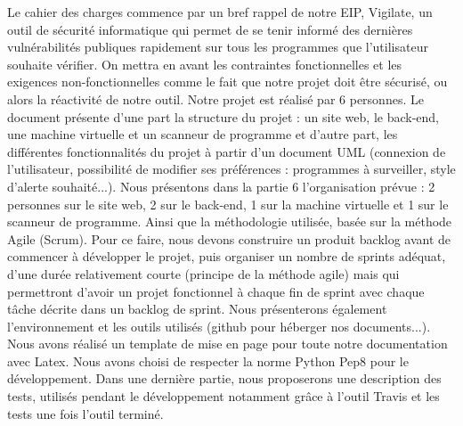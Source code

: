 Le cahier des charges commence par un bref rappel de notre EIP, Vigilate, un outil de sécurité informatique qui permet de se tenir informé des dernières vulnérabilités publiques rapidement sur tous les programmes que l’utilisateur souhaite vérifier. On mettra en avant les contraintes fonctionnelles et les exigences non-fonctionnelles comme le fait que notre projet doit être sécurisé, ou alors la réactivité de notre outil. Notre projet est réalisé par 6 personnes. Le document présente d’une part la structure du projet : un site web, le back-end, une machine virtuelle et un scanneur de programme et d’autre part, les différentes fonctionnalités du projet à partir d’un document UML (connexion de l’utilisateur, possibilité de modifier ses préférences : programmes à surveiller, style d’alerte souhaité...). Nous présentons dans la partie 6 l’organisation prévue : 2 personnes sur le site web, 2 sur le back-end, 1 sur la machine virtuelle et 1 sur le scanneur de programme. Ainsi que la méthodologie utilisée, basée sur la méthode Agile (Scrum). Pour ce faire, nous devons construire un produit backlog avant de commencer à développer le projet, puis organiser un nombre de sprints adéquat, d’une durée relativement courte (principe de la méthode agile) mais qui permettront d’avoir un projet fonctionnel à chaque fin de sprint avec chaque tâche décrite dans un backlog de sprint. Nous présenterons également l’environnement et les outils utilisés (github pour héberger nos documents...). Nous avons réalisé un template de mise en page pour toute notre documentation avec Latex. Nous avons choisi de respecter la norme Python Pep8 pour le développement. Dans une dernière partie, nous proposerons une description des tests, utilisés pendant le développement notamment grâce à l’outil Travis et les tests une fois l’outil terminé.\\